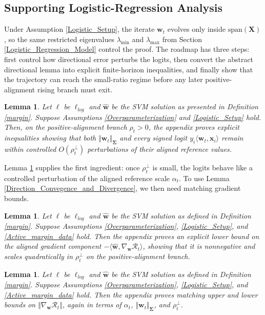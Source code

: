 \documentclass[pdflatex,sn-basic]{sn-jnl}%
\theoremstyle{thmstyleone}%
\newtheorem{lemma}[theorem]{Lemma}
\begin{document}
\subsection{Supporting Logistic-Regression Analysis}\label{proof_overview_Logistic_Regression}
Under Assumption \ref{Logistic_Setup}, the iterate $\mathbf{w}_t$ evolves only inside $\text{span} \left(\mathbf{X}\right)$, so the same restricted eigenvalues $\lambda_{\min}$ and $\lambda_{\max}$ from Section \ref{Logistic_Regression_Model} control the proof. The roadmap has three steps: first control how directional error perturbs the logits, then convert the abstract directional lemma into explicit finite-horizon inequalities, and finally show that the trajectory can reach the small-ratio regime before any later positive-alignment rising branch must exit.
\begin{lemma}\label{logit_bound}
  Let $\ell$ be $\ell_{log}$ and $\hat{\mathbf{w}}$ be the SVM solution as presented in Definition \ref{margin}. Suppose Assumptions \ref{Overparameterization} and \ref{Logistic_Setup} hold. Then, on the positive-alignment branch $\rho_t>0$, the appendix proves explicit inequalities showing that both $\Vert \mathbf{w}_t \Vert_{\mathbf{\Sigma}}$ and every signed logit $y_i\langle \mathbf{w}_t,\mathbf{x}_i\rangle$ remain within controlled $O(\rho_t^\perp)$ perturbations of their aligned reference values.
\end{lemma}
Lemma \ref{logit_bound} supplies the first ingredient: once $\rho_t^\perp$ is small, the logits behave like a controlled perturbation of the aligned reference scale $\alpha_t$. To use Lemma \ref{Direction_Convegence_and_Divergence}, we then need matching gradient bounds.
\begin{lemma}\label{inner_product_bound}
  Let $\ell$ be $\ell_{log}$ and $\hat{\mathbf{w}}$ be the SVM solution as defined in Definition \ref{margin}. Suppose Assumptions \ref{Overparameterization}, \ref{Logistic_Setup}, and \ref{Active_margin_data} hold. Then the appendix proves an explicit lower bound on the aligned gradient component $-\langle \hat{\mathbf{w}}, \nabla_{\mathbf{w}} \mathcal{R}_t\rangle$, showing that it is nonnegative and scales quadratically in $\rho_t^{\perp}$ on the positive-alignment branch.
\end{lemma}
\begin{lemma}\label{Gradient_Norm_Bound}
  Let $\ell$ be $\ell_{log}$ and $\hat{\mathbf{w}}$ be the SVM solution as defined in Definition \ref{margin}. Suppose Assumptions \ref{Overparameterization}, \ref{Logistic_Setup}, and \ref{Active_margin_data} hold. Then the appendix proves matching upper and lower bounds on $\Vert \nabla_{\mathbf{w}} \mathcal{R}_t \Vert$, again in terms of $\alpha_t$, $\Vert \mathbf{w}_t \Vert_{\mathbf{\Sigma}}$, and $\rho_t^{\perp}$.
\end{lemma}
\end{document}
